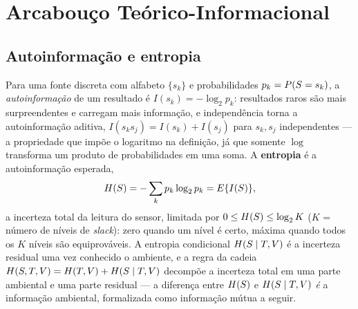 \section{Arcabouço Teórico-Informacional}
\label{sec:theory}


\subsection{Autoinformação e entropia}
\label{sec:th-entropy}
Para uma fonte discreta com alfabeto $\{s_k\}$ e probabilidades
$p_k=P(S=s_k)$, a \emph{autoinformação} de um resultado é
$I(s_k)=-\log_2 p_k$: resultados raros são mais surpreendentes e carregam
mais informação, e independência torna a autoinformação aditiva,
$I(s_ks_j)=I(s_k)+I(s_j)$ para $s_k,s_j$ independentes --- a propriedade que
impõe o logaritmo na definição, já que somente $\log$ transforma um produto
de probabilidades em uma soma. A \textbf{entropia} \cite{cover2006} é a
autoinformação esperada,
\begin{equation}
  H\!\left(S\right) = -\sum_k p_k\log_2 p_k = E\{I(S)\},
  \label{eq:entropy}
\end{equation}
a incerteza total da leitura do sensor, limitada por
$0\le H\!\left(S\right)\le\log_2 K$ ($K$ = número de níveis de \emph{slack}): zero
quando um nível é certo, máxima quando todos os $K$ níveis são
equiprováveis. A entropia condicional $H\!\left(S\mid T,V\right)$ é a
incerteza residual uma vez conhecido o ambiente, e a regra da cadeia
$H\!\left(S,T,V\right)=H\!\left(T,V\right)+H\!\left(S\mid T,V\right)$
decompõe a incerteza total em uma parte ambiental e uma parte residual --- a
diferença entre $H\!\left(S\right)$ e $H\!\left(S\mid T,V\right)$ \emph{é} a
informação ambiental, formalizada como informação mútua a seguir.

